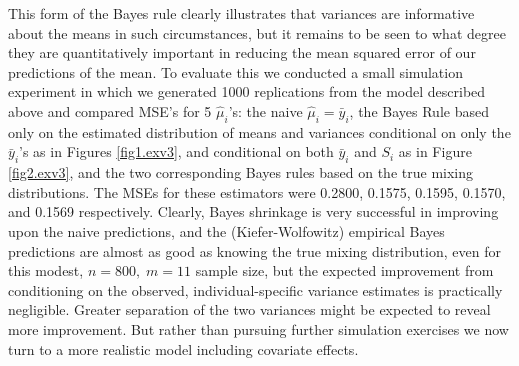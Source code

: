 \documentclass[12pt]{amsart}
\begin{document}
This form of the Bayes rule clearly illustrates that variances are informative
about the means in such circumstances, but it remains to be seen to what degree
they are quantitatively important in reducing the mean squared error of our
predictions of the mean.  To evaluate this we conducted a small simulation
experiment in which we generated 1000 replications from the model described
above and compared MSE's for 5 $\hat \mu_i$'s:  the naive $\hat \mu_i = \bar y_i$,
the Bayes Rule based only on the estimated distribution of means and variances
conditional on only the $\bar y_i$'s as in Figures \ref{fig1.exv3}, and conditional
on both $\bar y_i$ and $S_i$ as in Figure \ref{fig2.exv3}, and the two corresponding
Bayes rules based on the true mixing distributions.  The MSEs for these estimators
were 0.2800, 0.1575, 0.1595, 0.1570, and 0.1569 respectively.  Clearly, Bayes 
shrinkage is very successful in improving upon the naive predictions, and the
(Kiefer-Wolfowitz) empirical Bayes predictions are almost as good as
knowing the true mixing distribution, even for this modest, $n = 800, \; m = 11$ 
sample size, but the expected improvement from conditioning on the observed, 
individual-specific variance estimates is practically negligible.  Greater separation of the 
two variances might be expected to reveal more improvement.  But rather than 
pursuing further simulation exercises we now turn to 
a more realistic model including covariate effects.
\end{document}

